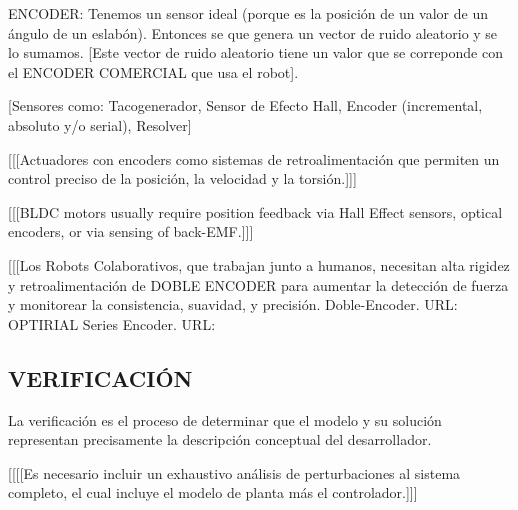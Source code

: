 \documentclass{article}
\begin{document}
\begin{sloppypar}
ENCODER: Tenemos un sensor ideal (porque es la posición de un valor de un ángulo de un eslabón). Entonces se que genera un vector de ruido aleatorio y se lo sumamos. [Este vector de ruido aleatorio tiene un valor que se correponde con el ENCODER COMERCIAL que usa el robot].

[Sensores como: Tacogenerador, Sensor de Efecto Hall, Encoder (incremental, absoluto y/o serial), Resolver]

[[[Actuadores con encoders como sistemas de retroalimentación que permiten un control preciso de la posición, la velocidad y la torsión.]]]

[[[BLDC motors usually require position feedback via Hall Effect sensors, optical encoders, or via sensing of back-EMF.]]] %


[[[Los Robots Colaborativos, que trabajan junto a humanos, necesitan alta rigidez y retroalimentación de DOBLE ENCODER para aumentar la detección de fuerza y monitorear la consistencia, suavidad, y precisión. Doble-Encoder. URL: %
OPTIRIAL Series Encoder. URL: %









\subsection{VERIFICACIÓN}
\label{sec:VERIFICACIÓN}

La verificación es el proceso de determinar que el modelo y su solución representan precisamente la descripción conceptual del desarrollador.

[[[[Es necesario incluir un exhaustivo análisis de perturbaciones al sistema completo, el cual incluye el modelo de planta más el controlador.]]]
























\end{sloppypar}
\end{document}
